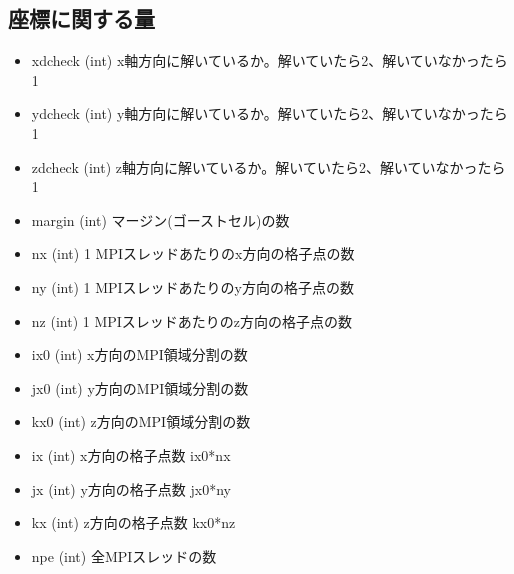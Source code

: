 \documentclass[letterpaper,10pt,dvipdfmx,report]{sphinxmanual}
\begin{document}
\subsection{座標に関する量}
\label{\detokenize{notation:id2}}\begin{itemize}
\item {} 
xdcheck (int) \sphinxhyphen{}\sphinxhyphen{} x軸方向に解いているか。解いていたら2、解いていなかったら1

\item {} 
ydcheck (int) \sphinxhyphen{}\sphinxhyphen{} y軸方向に解いているか。解いていたら2、解いていなかったら1

\item {} 
zdcheck (int) \sphinxhyphen{}\sphinxhyphen{} z軸方向に解いているか。解いていたら2、解いていなかったら1

\item {} 
margin (int) \sphinxhyphen{}\sphinxhyphen{} マージン(ゴーストセル)の数

\item {} 
nx (int) \sphinxhyphen{}\sphinxhyphen{} 1 MPIスレッドあたりのx方向の格子点の数

\item {} 
ny (int) \sphinxhyphen{}\sphinxhyphen{} 1 MPIスレッドあたりのy方向の格子点の数

\item {} 
nz (int) \sphinxhyphen{}\sphinxhyphen{} 1 MPIスレッドあたりのz方向の格子点の数

\item {} 
ix0 (int) \sphinxhyphen{}\sphinxhyphen{} x方向のMPI領域分割の数

\item {} 
jx0 (int) \sphinxhyphen{}\sphinxhyphen{} y方向のMPI領域分割の数

\item {} 
kx0 (int) \sphinxhyphen{}\sphinxhyphen{} z方向のMPI領域分割の数

\item {} 
ix (int) \sphinxhyphen{}\sphinxhyphen{} x方向の格子点数 ix0*nx

\item {} 
jx (int) \sphinxhyphen{}\sphinxhyphen{} y方向の格子点数 jx0*ny

\item {} 
kx (int) \sphinxhyphen{}\sphinxhyphen{} z方向の格子点数 kx0*nz

\item {} 
npe (int) \sphinxhyphen{}\sphinxhyphen{} 全MPIスレッドの数 


\end{itemize}
\end{document}

